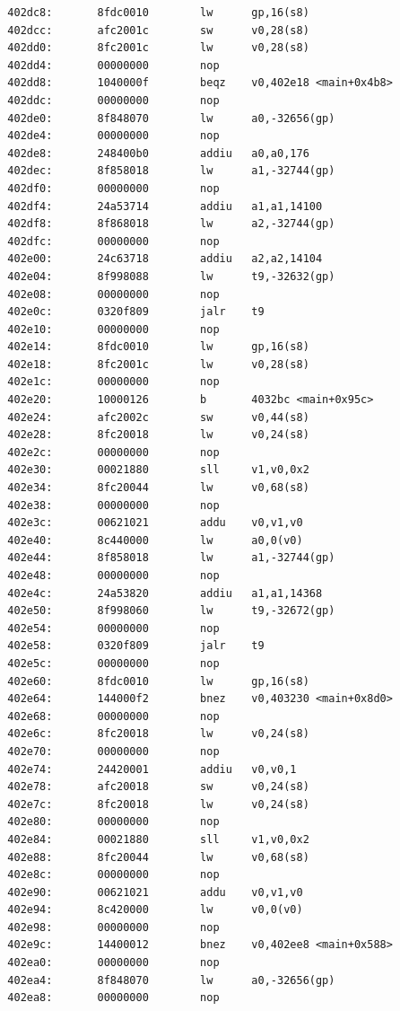 \documentclass[11pt]{article}
\begin{document}
\begin{verbatim}
  402dc8:       8fdc0010        lw      gp,16(s8)
  402dcc:       afc2001c        sw      v0,28(s8)
  402dd0:       8fc2001c        lw      v0,28(s8)
  402dd4:       00000000        nop
  402dd8:       1040000f        beqz    v0,402e18 <main+0x4b8>
  402ddc:       00000000        nop
  402de0:       8f848070        lw      a0,-32656(gp)
  402de4:       00000000        nop
  402de8:       248400b0        addiu   a0,a0,176
  402dec:       8f858018        lw      a1,-32744(gp)
  402df0:       00000000        nop
  402df4:       24a53714        addiu   a1,a1,14100
  402df8:       8f868018        lw      a2,-32744(gp)
  402dfc:       00000000        nop
  402e00:       24c63718        addiu   a2,a2,14104
  402e04:       8f998088        lw      t9,-32632(gp)
  402e08:       00000000        nop
  402e0c:       0320f809        jalr    t9
  402e10:       00000000        nop
  402e14:       8fdc0010        lw      gp,16(s8)
  402e18:       8fc2001c        lw      v0,28(s8)
  402e1c:       00000000        nop
  402e20:       10000126        b       4032bc <main+0x95c>
  402e24:       afc2002c        sw      v0,44(s8)
  402e28:       8fc20018        lw      v0,24(s8)
  402e2c:       00000000        nop
  402e30:       00021880        sll     v1,v0,0x2
  402e34:       8fc20044        lw      v0,68(s8)
  402e38:       00000000        nop
  402e3c:       00621021        addu    v0,v1,v0
  402e40:       8c440000        lw      a0,0(v0)
  402e44:       8f858018        lw      a1,-32744(gp)
  402e48:       00000000        nop
  402e4c:       24a53820        addiu   a1,a1,14368
  402e50:       8f998060        lw      t9,-32672(gp)
  402e54:       00000000        nop
  402e58:       0320f809        jalr    t9
  402e5c:       00000000        nop
  402e60:       8fdc0010        lw      gp,16(s8)
  402e64:       144000f2        bnez    v0,403230 <main+0x8d0>
  402e68:       00000000        nop
  402e6c:       8fc20018        lw      v0,24(s8)
  402e70:       00000000        nop
  402e74:       24420001        addiu   v0,v0,1
  402e78:       afc20018        sw      v0,24(s8)
  402e7c:       8fc20018        lw      v0,24(s8)
  402e80:       00000000        nop
  402e84:       00021880        sll     v1,v0,0x2
  402e88:       8fc20044        lw      v0,68(s8)
  402e8c:       00000000        nop
  402e90:       00621021        addu    v0,v1,v0
  402e94:       8c420000        lw      v0,0(v0)
  402e98:       00000000        nop
  402e9c:       14400012        bnez    v0,402ee8 <main+0x588>
  402ea0:       00000000        nop
  402ea4:       8f848070        lw      a0,-32656(gp)
  402ea8:       00000000        nop

\end{verbatim}
\end{document}
